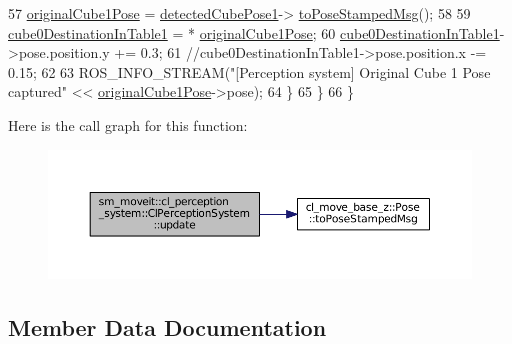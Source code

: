 \begin{DoxyCode}
57                 \hyperlink{classsm__moveit_1_1cl__perception__system_1_1ClPerceptionSystem_ab8851b53535efa7e154248c119e8c3cd}{originalCube1Pose} = \hyperlink{classsm__moveit_1_1cl__perception__system_1_1ClPerceptionSystem_ae09f06cb609d0a233fa9a0d31dcb09c6}{detectedCubePose1}->
      \hyperlink{classcl__move__base__z_1_1Pose_a63887a88c1ac6e9a4a71b8d7d11aed6c}{toPoseStampedMsg}();
58 
59                 \hyperlink{classsm__moveit_1_1cl__perception__system_1_1ClPerceptionSystem_ab84bbc2d5e5a7ef7839a0ade56942679}{cube0DestinationInTable1} = *
      \hyperlink{classsm__moveit_1_1cl__perception__system_1_1ClPerceptionSystem_ab8851b53535efa7e154248c119e8c3cd}{originalCube1Pose};
60                 \hyperlink{classsm__moveit_1_1cl__perception__system_1_1ClPerceptionSystem_ab84bbc2d5e5a7ef7839a0ade56942679}{cube0DestinationInTable1}->pose.position.y += 0.3;
61                 \textcolor{comment}{//cube0DestinationInTable1->pose.position.x -= 0.15;}
62 
63                 ROS\_INFO\_STREAM(\textcolor{stringliteral}{"[Perception system] Original Cube 1 Pose captured"} << 
      \hyperlink{classsm__moveit_1_1cl__perception__system_1_1ClPerceptionSystem_ab8851b53535efa7e154248c119e8c3cd}{originalCube1Pose}->pose);
64             \}
65         \}
66     \}
\end{DoxyCode}


Here is the call graph for this function\+:
\nopagebreak
\begin{figure}[H]
\begin{center}
\leavevmode
\includegraphics[width=350pt]{classsm__moveit_1_1cl__perception__system_1_1ClPerceptionSystem_aaefca9001d3836655d38ee92621c013e_cgraph}
\end{center}
\end{figure}




\subsection{Member Data Documentation}
